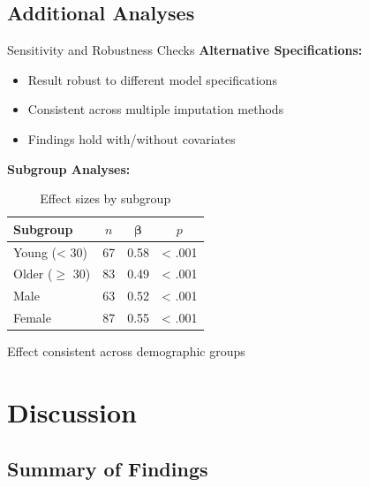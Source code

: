 \documentclass[aspectratio=169,11pt]{beamer}
\begin{document}
\subsection{Additional Analyses}

\begin{frame}{Sensitivity and Robustness Checks}
  \textbf{Alternative Specifications:}
  \begin{itemize}
    \item Result robust to different model specifications
    \item Consistent across multiple imputation methods
    \item Findings hold with/without covariates
  \end{itemize}

  \vspace{0.5cm}

  \textbf{Subgroup Analyses:}
  \begin{table}
    \centering
    \caption{Effect sizes by subgroup}
    \small
    \begin{tabular}{lccc}
      \toprule
      \textbf{Subgroup} & \textbf{$n$} & $\boldsymbol{\beta}$ & \textbf{$p$} \\
      \midrule
      Young (< 30) & 67 & 0.58 & < .001 \\
      Older ($\geq$ 30) & 83 & 0.49 & < .001 \\
      Male & 63 & 0.52 & < .001 \\
      Female & 87 & 0.55 & < .001 \\
      \bottomrule
    \end{tabular}
  \end{table}

  Effect consistent across demographic groups
\end{frame}


\section{Discussion}

\subsection{Summary of Findings}
\end{document}
